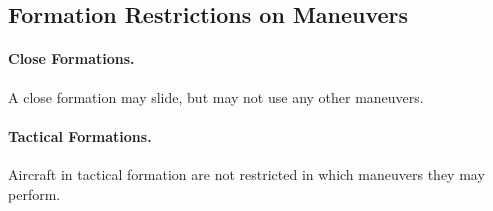 \begin{advancedrules}
\section{Formation Restrictions on Maneuvers}

\paragraph{Close Formations.} A close formation may slide, but may not use any other maneuvers.

\paragraph{Tactical Formations.} Aircraft in tactical formation are not restricted in which maneuvers they may perform.

\end{advancedrules}
